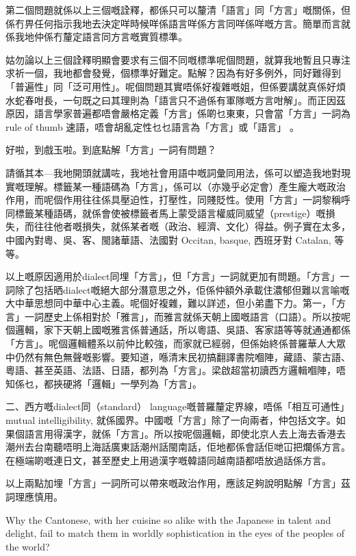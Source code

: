\documentclass[a5paper, 10pt, openany]{book} %
\begin{document}
第二個問題就係以上三個嘅詮釋，都係只可以釐清「語言」同「方言」嘅關係，但係冇畀任何指示我地去決定咩時候咩係語言咩係方言同咩係咩嘅方言。簡單而言就係我地仲係冇釐定語言同方言嘅實質標準。

姑勿論以上三個詮釋明顯會要求有三個不同嘅標準呢個問題，就算我地暫且只專注求祈一個，我地都會發覺，個標準好難定。點解？因為有好多例外，同好難得到「普遍性」同「泛可用性」。呢個問題其實唔係好複雜嘅姐，但係要講就真係好煩水蛇春咁長，一句既之曰其理則為「語言只不過係有軍隊嘅方言咁解」。而正因茲原因，語言學家普遍都唔會嚴格定義「方言」係啲乜東東，只會當「方言」一詞為rule of thumb 速語，唔會胡亂定性乜乜語言為「方言」或「語言」 。

好啦，到戲玉啦。到底點解「方言」一詞有問題？

請循其本—我地開頭就講咗，我地社會用語中嘅詞彙同用法，係可以塑造我地對現實嘅理解。標籤某一種語碼為「方言」，係可以（亦幾乎必定會）產生龐大嘅政治作用，而呢個作用往往係具壓迫性，打壓性，同賤貶性。使用「方言」一詞黎稱呼同標籤某種語碼，就係會使被標籤者馬上蒙受語言權威同威望（prestige）嘅損失，而往往他者嘅損失，就係某者嘅（政治、經濟、文化）得益。例子實在太多，中國內對粵、吳、客、閩諸華語、法國對 Occitan, basque, 西班牙對 Catalan, 等等。

以上嘅原因適用於dialect同埋「方言」，但「方言」一詞就更加有問題。「方言」一詞除了包括晒dialect嘅絕大部分潛意思之外，佢係仲額外承載住濃郁但難以言喻嘅大中華思想同中華中心主義。呢個好複雜，難以詳述，但小弟盡下力。第一，「方言」一詞歷史上係相對於「雅言」，而雅言就係天朝上國嘅語言（口語）。所以按呢個邏輯，家下天朝上國嘅雅言係普通話，所以粵語、吳語、客家語等等就通通都係「方言」。呢個邏輯體系以前仲比較強，而家就已經弱，但係始終係普羅華人大眾中仍然有無色無聲嘅影響。要知道，喺清末民初搞翻譯書院嗰陣，藏語、蒙古語、粵語、甚至英語、法語、日語，都列為「方言」。梁啟超當初讀西方邏輯嗰陣，唔知係乜，都挾硬將「邏輯」一學列為「方言」。

二、西方嘅dialect同（standard） language嘅普羅釐定界線，唔係「相互可通性」mutual intelligibility, 就係國界。中國嘅「方言」除了一向兩者，仲包括文字。如果個語言用得漢字，就係「方言」。所以按呢個邏輯，即使北京人去上海去香港去潮州去台南聽唔明上海話廣東話潮州話閩南話，佢地都係會話佢哋冚把爛係方言。在極端啲嘅連日文，甚至歷史上用過漢字嘅韓語同越南語都唔放過話係方言。

以上兩點加埋「方言」一詞所可以帶來嘅政治作用，應該足夠說明點解「方言」茲詞理應慎用。




Why the Cantonese, with her cuisine so alike with the Japanese in talent and delight, fail to match them in worldly sophistication in the eyes of the peoples of the world?
\end{document}
